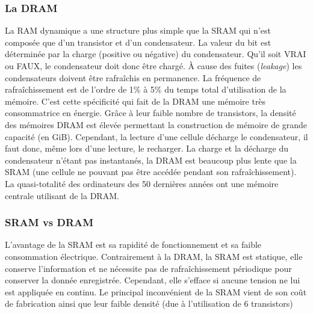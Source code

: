 \subsubsection{La DRAM} 
La RAM dynamique a une structure plus simple que la SRAM qui n'est composée que d'un transistor et d'un condensateur. La valeur du bit est déterminée par la charge (positive ou négative) du condensateur. Qu'il soit VRAI ou FAUX, le condensateur doit donc être chargé. 
À cause des fuites (\textit{leakage}) les condensateurs doivent être rafraîchis en permanence. La fréquence de rafraîchissement est de l'ordre de 1\% à 5\% du temps total d'utilisation de la mémoire. C’est cette spécificité qui fait de la DRAM une mémoire très consommatrice en énergie. Grâce à leur faible nombre de transistors, la densité des mémoires DRAM est élevée permettant la construction de mémoire de grande capacité (en GiB). Cependant, la lecture d’une cellule décharge le condensateur, il faut donc, même lors d’une lecture, le recharger.
La charge et la décharge du condensateur n’étant pas instantanés, la DRAM est beaucoup plus lente que la SRAM (une cellule ne pouvant pas être accédée pendant son rafraîchissement).
La quasi-totalité des ordinateurs des 50 dernières années ont une mémoire centrale utilisant de la DRAM.



\subsubsection{SRAM vs DRAM}

L'avantage de la SRAM est sa rapidité de fonctionnement et sa faible consommation électrique. Contrairement à la DRAM, la SRAM est statique, elle conserve l'information et ne nécessite pas de rafraîchissement périodique pour conserver la donnée enregistrée. Cependant, elle s'efface si aucune tension ne lui est appliquée en continu.
Le principal inconvénient de la SRAM vient de son coût de fabrication ainsi que leur faible densité (due à l'utilisation de 6 transistors)


